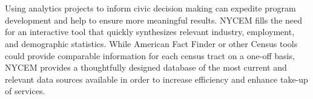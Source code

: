 \documentclass[11pt]{article} %
\begin{document}
\\\\
Using analytics projects to inform civic decision making can expedite program development and help to ensure more meaningful results. NYCEM fills the need for an interactive tool that quickly synthesizes relevant industry, employment, and demographic statistics. While American Fact Finder or other Census tools could provide comparable information for each census tract on a one-off basis, NYCEM provides a thoughtfully designed database of the most current and relevant data sources available in order to increase efficiency and enhance take-up of services.
\end{document}
